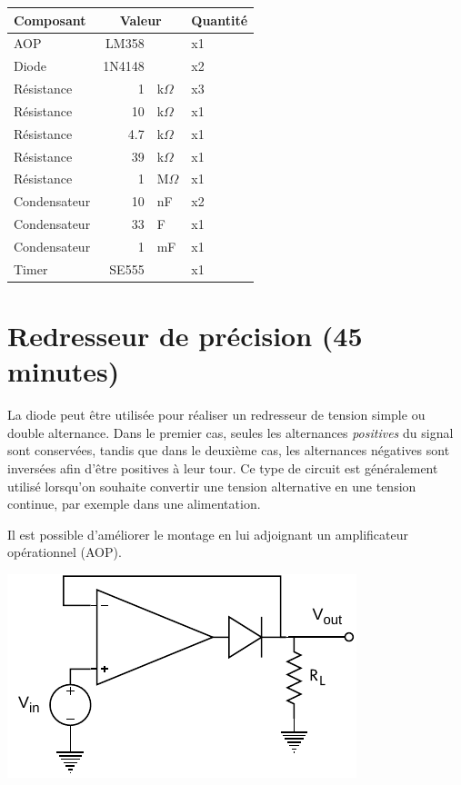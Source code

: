\documentclass{../../template/labo}
\begin{document}
\begin{center}
	\begin{tabular}{p{}rlp{}}
		Composant & \multicolumn{2}{c}{Valeur} & Quantité \\\toprule
		\multirow{1}{*}{AOP} & LM358 & & x1 \\\midrule
		\multirow{1}{*}{Diode} & 1N4148 & & x2 \\\midrule
		\multirow{1}{*}{Résistance} 	& 1 & k$\Omega$ & x3 \\\midrule
		\multirow{1}{*}{Résistance} 	& 10 & k$\Omega$ & x1 \\\midrule
		\multirow{1}{*}{Résistance} 	& 4.7 & k$\Omega$ & x1 \\\midrule
		\multirow{1}{*}{Résistance} 	& 39 & k$\Omega$ & x1 \\\midrule
		\multirow{1}{*}{Résistance} 	& 1 & M$\Omega$ & x1 \\\midrule
		\multirow{1}{*}{Condensateur} 	& 10 & nF & x2 \\\midrule
		\multirow{1}{*}{Condensateur} 	& 33 & \textmu F & x1 \\\midrule
		\multirow{1}{*}{Condensateur} 	& 1 & mF & x1 \\\midrule
		\multirow{1}{*}{Timer} 	& SE555 &  & x1 \\\bottomrule
	\end{tabular}
\end{center}

\section{Redresseur de précision (45 minutes)}
La diode peut être utilisée pour réaliser un redresseur de tension simple ou double alternance.
Dans le premier cas, seules les alternances \textit{positives} du signal sont conservées, tandis que dans le deuxième cas, les alternances négatives sont inversées afin d'être positives à leur tour.
Ce type de circuit est généralement utilisé lorsqu'on souhaite convertir une tension alternative en une tension continue, par exemple dans une alimentation.

Il est possible d'améliorer le montage en lui adjoignant un amplificateur opérationnel (AOP).
\begin{center}
	\includegraphics[width=.5\textwidth]{precision-rectifier.pdf}
\end{center}
\end{document}
